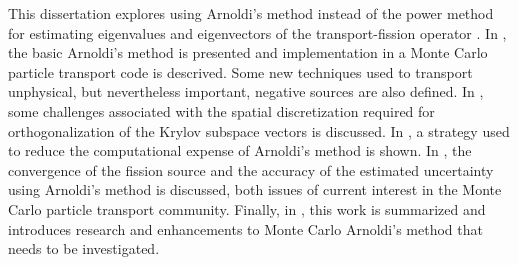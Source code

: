 This dissertation explores using Arnoldi's method instead of the power method for estimating eigenvalues and eigenvectors of the transport-fission operator \A.  In , the basic Arnoldi's method is presented and implementation in a Monte Carlo particle transport code is descrived.  Some new techniques used to transport unphysical, but nevertheless important, negative sources are also defined.  In , some challenges associated with the spatial discretization required for orthogonalization of the Krylov subspace vectors is discussed.  In , a strategy used to reduce the computational expense of Arnoldi's method is shown.  In , the convergence of the fission source and the accuracy of the estimated uncertainty using Arnoldi's method is discussed, both issues of current interest in the Monte Carlo particle transport community.  Finally, in ,  this work is summarized and introduces research and enhancements to Monte Carlo Arnoldi's method that needs to be investigated.
